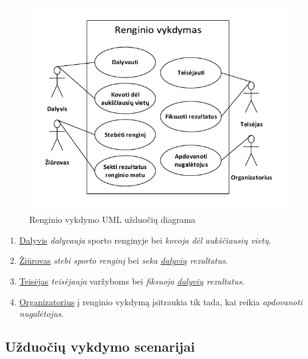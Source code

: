 \documentclass{VUMIFPSkursinis}
\begin{document}
        \begin{figure}[H]
          \centering
          \includegraphics[width=\textwidth]{img/UzduociuDiagrama2}
          \caption{Renginio vykdymo UML užduočių diagrama}
          \label{fig:vykdymoUzduociuDiagrama}
        \end{figure}

        \begin{enumerate}
          \item \underline{Dalyvis} \textit{dalyvauja} sporto renginyje bei \textit{kovoja dėl aukščiausių vietų}.
          \item \underline{Žiūrovas} \textit{stebi sporto renginį} bei \textit{seka \underline{dalyvių} rezultatus}.
          \item \underline{Teisėjas} \textit{teisėjauja} varžyboms bei \textit{fiksuoja \underline{dalyvių} rezultatus}.
          \item \underline{Organizatorius} į renginio vykdymą įsitraukia tik tada, kai reikia \textit{apdovanoti nugalėtojus}.
        \end{enumerate}

  \subsection{Užduočių vykdymo scenarijai} \label{vidineVersloProcesoAnalize_uzduociuVykdymoScenarijai}
\end{document}
